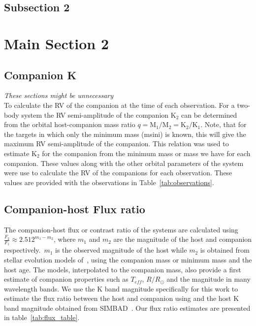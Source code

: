 
\subsection{Subsection 2}


\section{Main Section 2}



\subsection{Companion K}
\label{sec:companion_RV}
\emph{These sections might be unnecessary}\\

To calculate the RV of the companion at the time of each observation. For a two-body system the RV semi-amplitude of the companion $\textrm{K}_{2}$ can be determined from the orbital host-companion mass ratio $q = \textrm{M}_{1}/\textrm{M}_{2} = \textrm{K}_{2}/\textrm{K}_{1}$.
Note, that for the targets in which only the minimum mass (msini) is known, this will give the maximum RV semi-amplitude of the companion.
This relation was used to estimate $\textrm{K}_2$ for the companion from the minimum mass or mass we have for each companion. These values along with the other orbital parameters of the system were use to calculate the RV of the companions for each observation. These values are provided with the observations in Table~\ref{tab:observations}.


\subsection{Companion-host Flux ratio}
The companion-host flux or contrast ratio of the systems are calculated using $ \frac{F_{2}}{F_{1}} \approx 2.512^{m_1-m_2} $, where $m_1$ and $m_2$ are the magnitude of the host and companion respectively.\ $m_1$ is the observed magnitude of the host while $m_2$ is obtained from stellar evolution models of~\citet{baraffe_evolutionary_2003, baraffe_new_2015}, using the companion mass or minimum mass and the host age. The models, interpolated to the companion mass, also provide a first estimate of companion properties such as $T_{eff}$, $R/R_{\odot}$ and the magnitude in many wavelength bands.
We use the K band magnitude specifically for this work to estimate the flux ratio between the host and companion using and the host K band magnitude obtained from SIMBAD~\citep{wenger_simbad_2000}. Our flux ratio estimates are presented in table~\ref{tab:flux_table}.

